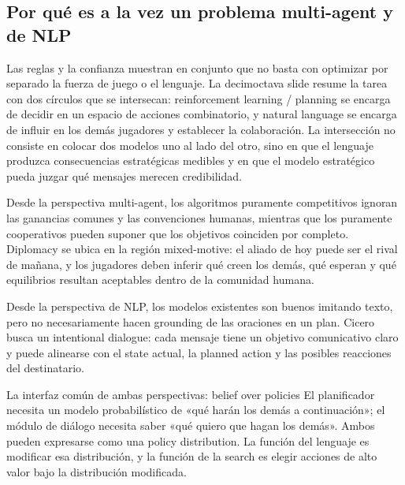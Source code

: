 \subsection{Por qué es a la vez un problema multi-agent y de NLP}

Las reglas y la confianza muestran en conjunto que no basta con optimizar por separado la fuerza de juego o el lenguaje. La decimoctava slide resume la tarea con dos círculos que se intersecan: reinforcement learning / planning se encarga de decidir en un espacio de acciones combinatorio, y natural language se encarga de influir en los demás jugadores y establecer la colaboración. La intersección no consiste en colocar dos modelos uno al lado del otro, sino en que el lenguaje produzca consecuencias estratégicas medibles y en que el modelo estratégico pueda juzgar qué mensajes merecen credibilidad.


Desde la perspectiva multi-agent, los algoritmos puramente competitivos ignoran las ganancias comunes y las convenciones humanas, mientras que los puramente cooperativos pueden suponer que los objetivos coinciden por completo. Diplomacy se ubica en la región mixed-motive: el aliado de hoy puede ser el rival de mañana, y los jugadores deben inferir qué creen los demás, qué esperan y qué equilibrios resultan aceptables dentro de la comunidad humana.


Desde la perspectiva de NLP, los modelos existentes son buenos imitando texto, pero no necesariamente hacen grounding de las oraciones en un plan. Cicero busca un intentional dialogue: cada mensaje tiene un objetivo comunicativo claro y puede alinearse con el state actual, la planned action y las posibles reacciones del destinatario.


\begin{knowledgebox}{La interfaz común de ambas perspectivas: belief over policies}
El planificador necesita un modelo probabilístico de «qué harán los demás a continuación»; el módulo de diálogo necesita saber «qué quiero que hagan los demás». Ambos pueden expresarse como una policy distribution. La función del lenguaje es modificar esa distribución, y la función de la search es elegir acciones de alto valor bajo la distribución modificada.
\end{knowledgebox}

